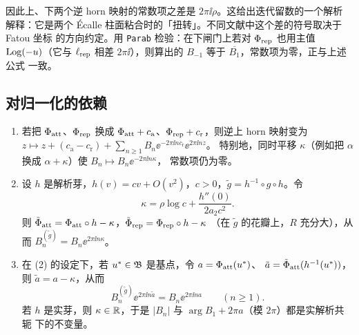 因此上、下两个逆 horn 映射的常数项之差是 $2\pi\ii\rho$。这给出迭代留数的一个解析
解释：它是两个 Écalle 柱面粘合时的「扭转」。不同文献中这个差的符号取决于 Fatou 坐标
的方向约定。用 \texttt{Parab} 检验：在下闸门上若对 $\Phi_{\mathrm{rep}}$ 也用主值 $\operatorname{Log}(-u)$（它与
$\ell_{\mathrm{rep}}$ 相差 $2\pi\ii$），则算出的 $B_{-1}$ 等于 $\overline{B_1}$，常数项为零，正与上述公式
一致。

\subsection{对归一化的依赖}

\begin{proposition}[归一化与共轭]\label{ch3:prop:normalisation}
\begin{enumerate}
\item 若把 $\Phi_{\mathrm{att}}$、$\Phi_{\mathrm{rep}}$ 换成 $\Phi_{\mathrm{att}}+c_{\mathrm a}$、$\Phi_{\mathrm{rep}}+c_{\mathrm r}$，则逆上 horn
 映射变为 $z\mapsto z+(c_{\mathrm a}-c_{\mathrm r})+\sum_{n\ge1}B_n\ee^{-2\pi\ii nc_{\mathrm r}}\ee^{2\pi\ii nz}$。
 特别地，同时平移 $\kappa$（例如把 $\alpha$ 换成 $\alpha+\kappa$）使 $B_n\mapsto B_n\ee^{-2\pi\ii n\kappa}$，
 常数项仍为零。
\item 设 $h$ 是解析芽，$h(v)=cv+O(v^2)$，$c>0$，$\tilde g=h^{-1}\circ g\circ h$。令
 \[
  \kappa=\rho\log c+\frac{h''(0)}{2a_2c^2}.
 \]
 则 $\tilde\Phi_{\mathrm{att}}=\Phi_{\mathrm{att}}\circ h-\kappa$，$\tilde\Phi_{\mathrm{rep}}=\Phi_{\mathrm{rep}}\circ h-\kappa$
 （在 $\tilde g$ 的花瓣上，$R$ 充分大），从而 $B_n^{(\tilde g)}=B_n\ee^{2\pi\ii n\kappa}$。
\item 在 (2) 的设定下，若 $u^{*}\in\mathfrak B$ 是基点，令 $a=\Phi_{\mathrm{att}}(u^{*})$、
 $\tilde a=\tilde\Phi_{\mathrm{att}}(h^{-1}(u^{*}))$，则 $\tilde a=a-\kappa$，从而
 \[
  B_n^{(\tilde g)}\ee^{2\pi\ii n\tilde a}=B_n\ee^{2\pi\ii na}\qquad(n\ge1).
 \]
 若 $h$ 是实芽，则 $\kappa\in\mathbb{R}$，于是 $|B_n|$ 与 $\arg B_1+2\pi a$（模 $2\pi$）都是实解析共轭
 下的不变量。
\end{enumerate}
\end{proposition}

